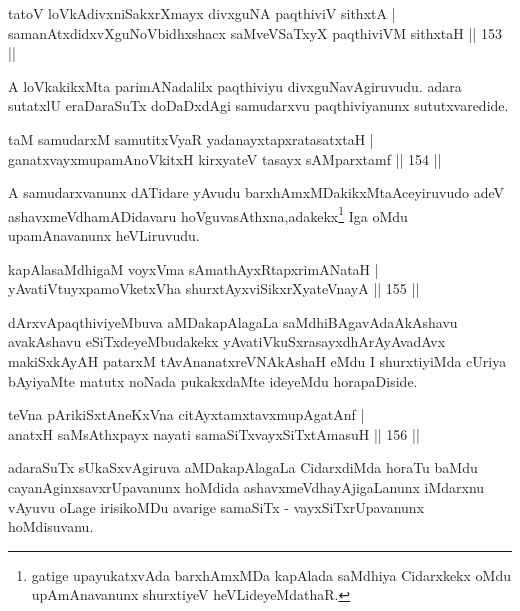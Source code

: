 \begin{shl}
tatoV loVkAdivxniSakxrXmayx divxguNA paqthiviV sithxtA |\\
samanAtxdidxvXguNoV\s bidhxshacx saMveVSaTxyX paqthiviVM sithxtaH \hfill || 153 ||
\end{shl}

\begin{artha}
A loVkakikxMta parimANadalilx paqthiviyu divxguNavAgiruvudu. adara sutatxlU eraDaraSuTx doDaDxdAgi samudarxvu paqthiviyanunx sututxvaredide.
\end{artha}

\begin{shl}
taM samudarxM samutitxVyaR yadanayxtapxratasatxtaH |\\
ganatxvayxmupamAnoVkitxH kirxyateV tasayx sAMparxtamf \hfill || 154 ||
\end{shl}

\begin{artha}
A samudarxvanunx dATidare yAvudu barxhAmxMDakikxMta\break Aceyiruvudo adeV ashavxmeVdhamADidavaru hoVguvasAthxna,\break adakekx\footnote{gatige upayukatxvAda barxhAmxMDa  kapAlada saMdhiya Cidarxkekx oMdu upAmAnavanunx shurxtiyeV heVLideyeMdathaR.} Iga oMdu upamAnavanunx heVLiruvudu.
\end{artha}

\begin{shl}
kapAlasaMdhigaM voyxVma sAmathAyxRtapxrimANataH |\\
yAvatiVtuyxpamoVketxVha shurxtAyx\s \s viSikxrXyateV\s nayA \hfill || 155 ||
\end{shl}

\begin{artha}
dArxvApaqthiviyeMbuva aMDakapAlagaLa saMdhiBAgavAda\break AkAshavu avakAshavu eSiTxdeyeMbudakekx yAvatiVkuSxrasayx\break dhArAyAvadAvx makiSxkAyAH patarxM tAvAnanatxreVNAkAshaH eMdu I shurxtiyiMda cUriya bAyiyaMte matutx noNada pukakxdaMte ideyeMdu horapaDiside.
\end{artha}


\begin{shl}
teVna pArikiSxtAneKxVna citAyxtamxtavxmupAgatAnf |\\
anatxH saMsAthxpayx nayati samaSiTxvayxSiTxtAmasuH \hfill || 156 ||
\end{shl}

\begin{artha}
adaraSuTx sUkaSxvAgiruva aMDakapAlagaLa CidarxdiMda horaTu baMdu cayanAginxsavxrUpavanunx hoMdida ashavxmeVdhayAjigaLanunx iMdarxnu vAyuvu oLage irisikoMDu avarige samaSiTx - vayxSiTxrUpavanunx hoMdisuvanu.
\end{artha}

